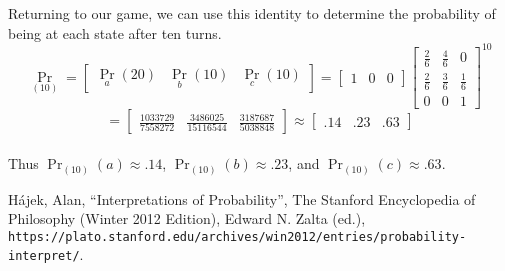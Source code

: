 \documentclass{article}
\begin{document}
	Returning to our game, we can use this identity to determine the probability of being at each state after ten turns.
	\[{\Pr}_{(10)} = 
	\begin{bmatrix}
	{\Pr}_{a}(20) & {\Pr}_{b}(10) & {\Pr}_{c}(10)
	\end{bmatrix} =
	\begin{bmatrix}
	1 & 0 & 0
	\end{bmatrix}
	\begin{bmatrix}
		\frac{2}{6} & \frac{4}{6} & 0           \\
		\frac{2}{6} & \frac{3}{6} & \frac{1}{6} \\
		0           & 0			  & 1
	\end{bmatrix}
	^{10}
	\]
	\[
	=	
	\begin{bmatrix}
	\frac{1033729}{7558272} & \frac{3486025}{15116544} & \frac{3187687}{5038848}
	\end{bmatrix}
	\approx \begin{bmatrix}
	.14 & .23 & .63
	\end{bmatrix}
	\]
\\
Thus $\Pr_{(10)}(a) \approx .14$, $\Pr_{(10)}(b) \approx .23$, and $\Pr_{(10)}(c) \approx .63$.
	
	\begin{thebibliography}{9}
		H\'{a}jek, Alan, ``Interpretations of Probability'', The Stanford Encyclopedia of Philosophy (Winter 2012 Edition), Edward N. Zalta (ed.), \texttt{https://plato.stanford.edu/archives/win2012/entries/probability-interpret/}.
	\end{thebibliography}
\end{document}
